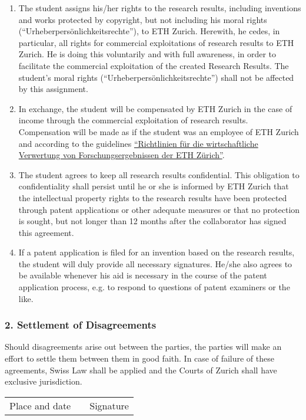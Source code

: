 \begin{enumerate}[topsep=0pt,itemsep=0ex,partopsep=1ex,parsep=1ex]
\item The student assigns his/her rights to the research results, including inventions and works protected by copyright, but not including his moral rights (“Urheberpers\"onlichkeitsrechte”), to ETH Zurich. Herewith, he cedes, in particular, all rights for commercial exploitations of research results to ETH Zurich. He is doing this voluntarily and with full awareness, in order to facilitate the commercial exploitation of the created Research Results. The student's moral rights (“Urheberpers\"onlichkeitsrechte”) shall not be affected by this assignment.

\item	In exchange, the student will be compensated by ETH Zurich in the case of income through the commercial exploitation of research results. Compensation will be made as if the student was an employee of ETH Zurich and according to the guidelines  \href{https://rechtssammlung.sp.ethz.ch/Dokumente/440.4.pdf?Web=1}{“Richtlinien f\"ur die wirtschaftliche Verwertung von Forschungsergebnissen der ETH Z\"urich”}.

\item	The student agrees to keep all research results confidential. This obligation to confidentiality shall persist until he or she is informed by ETH Zurich that the intellectual property rights to the research results have been protected through patent applications or other adequate measures or that no protection is sought, but not longer than 12 months after the collaborator has signed this agreement.

\item If a patent application is filed for an invention based on the research results, the student will duly provide all necessary signatures. He/she also agrees to be available whenever his aid is necessary in the course of the patent application process, e.g. to respond to questions of patent examiners or the like. 

\end{enumerate}

\subsubsection*{2. Settlement of Disagreements}

Should disagreements arise out between the parties, the parties will make an effort to settle them between them in good faith.
In case of failure of these agreements, Swiss Law shall be applied and the Courts of Zurich shall have exclusive jurisdiction.



\vspace{3cm}

\begin{tabular}{ p{5cm} p{1cm} p{5cm} }
  \cline{1-1} \cline{3-3}
  Place and date & & Signature \\
\end{tabular}
